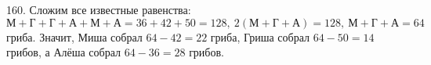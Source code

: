 160. Сложим все известные равенства: $\text{М}+\text{Г}+\text{Г}+\text{А}+\text{М}+\text{А}=36+42+50=128,\ 2(\text{М}+\text{Г}+\text{А})=128,\ \text{М}+\text{Г}+\text{А}=64$ гриба. Значит, Миша собрал $64-42=22$ гриба, Гриша собрал $64-50=14$ грибов, а Алёша собрал $64-36=28$ грибов.\\
